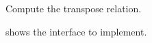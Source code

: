 
\begin{codeexercise}
    Compute the transpose relation.

     shows the interface to implement.
\end{codeexercise}

